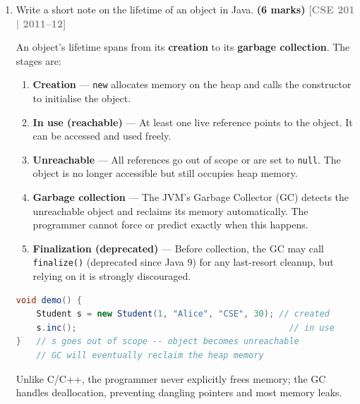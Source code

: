 \documentclass[12pt,a3paper]{article}
\newcommand{\yr}[1]{\hfill\textcolor{gray}{\small\textbf{[#1]}}}
\newcommand{\mk}[1]{\textcolor{orange!70!black}{\small\textbf{(#1 marks)}}}
\begin{document}
\begin{enumerate}
\item Write a short note on the lifetime of an object in Java. \mk{6}
\yr{CSE 201 | 2011--12}

\begin{tcolorbox}[enhanced,breakable,ansbox,
  colback=cC!4,colframe=cC,boxrule=0.8pt,arc=5pt,
  title={\textbf{Answer --- Lifetime of an Object in Java}},
  fonttitle=\bfseries\color{white},colbacktitle=cC]

An object's lifetime spans from its \textbf{creation} to its
\textbf{garbage collection}. The stages are:

\begin{enumerate}[label=\textbf{\arabic*.}, itemsep=3pt]
  \item \textbf{Creation} --- \texttt{new} allocates memory on the
  heap and calls the constructor to initialise the object.

  \item \textbf{In use (reachable)} --- At least one live reference
  points to the object. It can be accessed and used freely.

  \item \textbf{Unreachable} --- All references go out of scope or are
  set to \texttt{null}. The object is no longer accessible but still
  occupies heap memory.

  \item \textbf{Garbage collection} --- The JVM's Garbage Collector
  (GC) detects the unreachable object and reclaims its memory
  automatically. The programmer cannot force or predict exactly when
  this happens.

  \item \textbf{Finalization (deprecated)} --- Before collection, the
  GC may call \texttt{finalize()} (deprecated since Java 9) for any
  last-resort cleanup, but relying on it is strongly discouraged.
\end{enumerate}

\begin{lstlisting}[language=Java]
void demo() {
    Student s = new Student(1, "Alice", "CSE", 30); // created
    s.inc();                                          // in use
}   // s goes out of scope -- object becomes unreachable
    // GC will eventually reclaim the heap memory
\end{lstlisting}

Unlike C/C++, the programmer never explicitly frees memory; the GC
handles deallocation, preventing dangling pointers and most memory
leaks.
\end{tcolorbox}


\end{enumerate}
\end{document}

